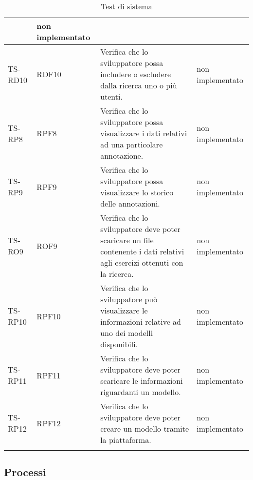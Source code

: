 {\begin{longtable}{|>{\centering\arraybackslash}m{1.6cm}|>{\centering\arraybackslash}m{1.7cm}|m{6.41cm}|>{\centering\arraybackslash}m{3.1cm}|}
		& non implementato\\ \hline
		\rowcolor{LightGray}
		TS-RD10		
		& RDF10 
		& Verifica che lo sviluppatore possa includere o escludere dalla ricerca uno o più utenti. 
		& non implementato\\ \hline 
		\rowcolor{white}
		TS-RP8		
		& RPF8 
		& Verifica che lo sviluppatore possa visualizzare i dati relativi ad una particolare annotazione. 		
		& non implementato\\ \hline
		\rowcolor{LightGray}
		TS-RP9		
		& RPF9 
		& Verifica che lo sviluppatore possa visualizzare lo storico delle annotazioni. 
		&  non implementato\\ \hline
		\rowcolor{white}
		TS-RO9
		& ROF9 
		& Verifica che lo sviluppatore deve poter scaricare un file contenente i dati relativi agli esercizi ottenuti con la ricerca.
		& non implementato\\ \hline
		\rowcolor{LightGray}
		TS-RP10		
		& RPF10 
		& Verifica che lo sviluppatore può visualizzare le informazioni relative ad uno dei modelli disponibili. 
		& non implementato\\ \hline
		\rowcolor{white}
		TS-RP11		
		& RPF11 
		& Verifica che lo sviluppatore deve poter scaricare le informazioni riguardanti un modello. 
		& non implementato\\ \hline
		\rowcolor{LightGray}
		TS-RP12		
		& RPF12 
		& Verifica che lo sviluppatore deve poter creare un modello tramite la piattaforma. 
		& non implementato\\ \hline	
		
		\caption{Test di sistema}
\end{longtable}}
\subsection{Processi}
